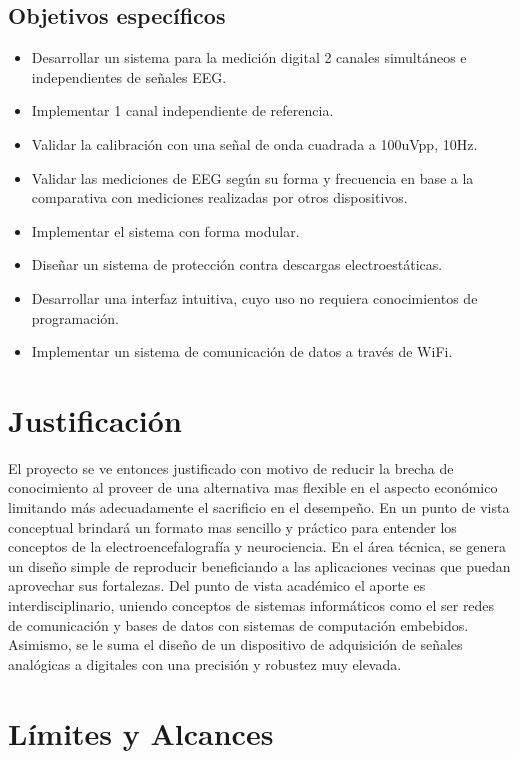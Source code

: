 \documentclass[11pt]{article}
\begin{document}
\subsection{Objetivos específicos}
\label{sec:orgfc91c2f}
\begin{itemize}
\item Desarrollar un sistema para la medición digital 2 canales simultáneos e independientes de señales EEG.
\item Implementar 1 canal independiente de referencia.
\item Validar la calibración con una señal de onda cuadrada a 100uVpp, 10Hz.
\item Validar las mediciones de EEG según su forma y frecuencia en base a la comparativa con mediciones realizadas por otros dispositivos.
\item Implementar el sistema con forma modular.
\item Diseñar un sistema de protección contra descargas electroestáticas.
\item Desarrollar una interfaz intuitiva, cuyo uso no requiera conocimientos de programación.
\item Implementar un sistema de comunicación de datos a través de WiFi.
\end{itemize}

\section{Justificación}
\label{sec:org289e7b4}
El proyecto se ve entonces justificado con motivo de reducir la brecha de conocimiento al proveer de una alternativa mas flexible en el aspecto económico limitando más adecuadamente el sacrificio en el desempeño. En un punto de vista conceptual brindará un formato mas sencillo y práctico para entender los conceptos de la electroencefalografía y neurociencia. En el área técnica, se genera un diseño simple de reproducir beneficiando a las aplicaciones vecinas que puedan aprovechar sus fortalezas. Del punto de vista académico el aporte es interdisciplinario, uniendo conceptos de sistemas informáticos como el ser redes de comunicación y bases de datos con sistemas de computación embebidos. Asimismo, se le suma el diseño de un dispositivo de adquisición de señales analógicas a digitales con una precisión y robustez muy elevada.

\section{Límites y Alcances}
\label{sec:orgd14478d}
\end{document}
